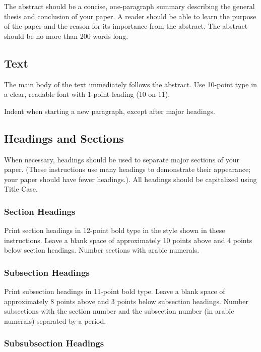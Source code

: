 \documentclass{article}
\begin{document}
The abstract should be a concise, one-paragraph summary describing the
general thesis and conclusion of your paper. A reader should be able
to learn the purpose of the paper and the reason for its importance
from the abstract. The abstract should be no more than 200 words long.

\subsection{Text}

The main body of the text immediately follows the abstract. Use
10-point type in a clear, readable font with 1-point leading (10 on
11).

Indent when starting a new paragraph, except after major headings.

\subsection{Headings and Sections}

When necessary, headings should be used to separate major sections of
your paper. (These instructions use many headings to demonstrate their
appearance; your paper should have fewer headings.). All headings should be capitalized using Title Case.

\subsubsection{Section Headings}

Print section headings in 12-point bold type in the style shown in
these instructions. Leave a blank space of approximately 10 points
above and 4 points below section headings.  Number sections with
arabic numerals.

\subsubsection{Subsection Headings}

Print subsection headings in 11-point bold type. Leave a blank space
of approximately 8 points above and 3 points below subsection
headings. Number subsections with the section number and the
subsection number (in arabic numerals) separated by a
period.

\subsubsection{Subsubsection Headings}
\end{document}

